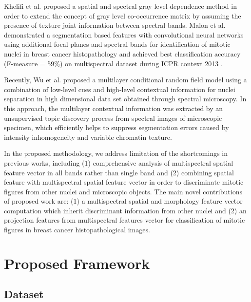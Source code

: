 \documentclass[10pt,twocolumn,letterpaper]{article}
\begin{document}
Khelifi et al. \cite{khelifi2012} proposed a spatial and spectral gray level dependence method in order to extend the concept of gray level co-occurrence matrix by assuming the presence of texture joint information between spectral bands. Malon et al. \cite{malon2013} demonstrated a segmentation based features with convolutional neural networks using additional focal planes and spectral bands for identification of mitotic nuclei in breast cancer histopathology and achieved best classification accuracy (F-measure = 59\%) on multispectral dataset during ICPR context 2013 \cite{roux2013}.

Recently, Wu et al. \cite{wu2012} proposed a multilayer conditional random field model using a combination of low-level cues and high-level contextual information for nuclei separation in high dimensional data set obtained through spectral microscopy. In this approach, the multilayer contextual information was extracted by an unsupervised topic discovery process from spectral images of microscopic specimen, which efficiently helps to suppress segmentation errors caused by intensity inhomogeneity and variable chromatin texture.

In the proposed methodology, we address limitation of the shortcomings in previous works, including (1) comprehensive analysis of multispectral spatial feature vector in all bands rather than single band \cite{masood2009,wu2009,wu2012} and (2) combining spatial feature with multispectral spatial feature vector in order to discriminate mitotic figures from other nuclei and microscopic objects. The main novel contributions of proposed work are: (1) a multispectral spatial and morphology feature vector computation which inherit discriminant information from other nuclei and (2) an projection features from multispectral features vector for classification of mitotic figures in breast cancer histopathological images.

\section{Proposed Framework}
\label{sec:framework}
\subsection{Dataset}
\end{document}
